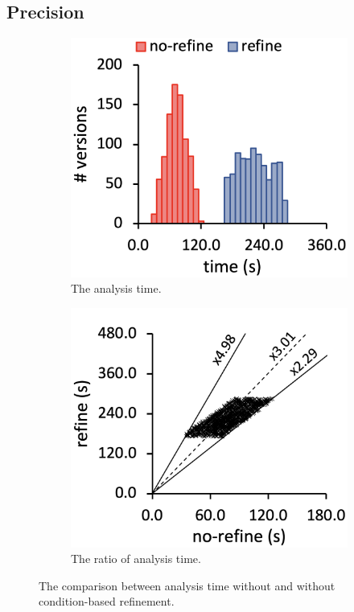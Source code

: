 \subsection{Precision}

\begin{figure}
  \centering
  \begin{subfigure}[b]{0.24\textwidth}
    \includegraphics[width=\textwidth]{img/compare-time}
    \caption{The analysis time.}
  \end{subfigure}
  \begin{subfigure}[b]{0.24\textwidth}
    \includegraphics[width=\textwidth]{img/ratio-time}
    \caption{The ratio of analysis time.}
  \end{subfigure}
  \caption{The comparison between analysis time without and without condition-based
  refinement.}
  \label{fig:refine}
\end{figure}

